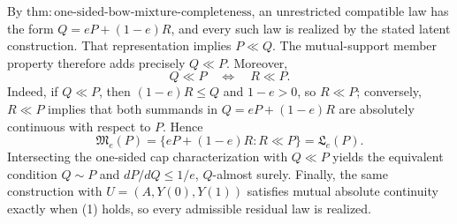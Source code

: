 By \(\mathrm{thm:one\text{-}sided\text{-}bow\text{-}mixture\text{-}completeness}\), an unrestricted compatible law has the form \(Q=eP+(1-e)R\), and every such law is realized by the stated latent construction.  That representation implies \(P\ll Q\).  The mutual-support member property therefore adds precisely \(Q\ll P\).  Moreover,
\[
 Q\ll P\quad\Longleftrightarrow\quad R\ll P. \tag{1}
\]
Indeed, if \(Q\ll P\), then \((1-e)R\le Q\) and \(1-e>0\), so \(R\ll P\); conversely, \(R\ll P\) implies that both summands in \(Q=eP+(1-e)R\) are absolutely continuous with respect to \(P\).  Hence
\[
 \mathfrak M_e(P)=\{eP+(1-e)R:R\ll P\}=\mathfrak L_e(P).
\]
Intersecting the one-sided cap characterization with \(Q\ll P\) yields the equivalent condition \(Q\sim P\) and \(dP/dQ\le1/e\), \(Q\)-almost surely.  Finally, the same construction with \(U=(A,Y(0),Y(1))\) satisfies mutual absolute continuity exactly when (1) holds, so every admissible residual law is realized.